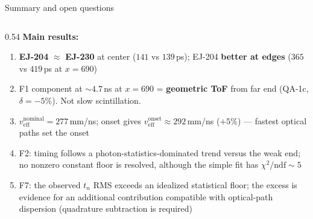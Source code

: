 \documentclass[aspectratio=169,9pt]{beamer}
\begin{document}
\begin{frame}{Summary and open questions}
  \footnotesize
  \begin{columns}[T]
    \begin{column}{0.54\textwidth}
      \textbf{Main results:}
      \begin{enumerate}
        \item \textcolor{ej204col}{\textbf{EJ-204}} $\approx$
              \textcolor{ej230col}{\textbf{EJ-230}} at center ($141$ vs $139$\,ps);
              EJ-204 \textbf{better at edges} ($365$ vs $419$\,ps at $x=690$)

        \item F1 component at $\sim4.7$\,ns at $x=690$ =
              \textcolor{okgreen}{\textbf{geometric ToF}} from far end
              (QA-1c, $\delta=-5\%$). Not slow scintillation.

        \item $v_\text{eff}^\text{nominal}=277$\,mm/ns;
              onset gives $v_\text{eff}^\text{onset}\approx292$\,mm/ns ($+5\%$)
              — fastest optical paths set the onset

        \item F2: timing follows a photon-statistics-dominated trend versus the weak end;
              no nonzero constant floor is resolved, although the simple fit has $\chi^2/\text{ndf}\sim5$

        \item F7: the observed $t_n$ RMS exceeds an idealized statistical floor;
              the excess is evidence for an additional contribution compatible with
              optical-path dispersion (quadrature subtraction is required)


\end{enumerate}
\end{column}
\end{columns}
\end{frame}
\end{document}
